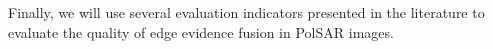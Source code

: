\documentclass{article}
\begin{document}
Finally, we will use several evaluation indicators presented in the literature to evaluate the quality of edge evidence fusion in PolSAR images.














\end{document}
